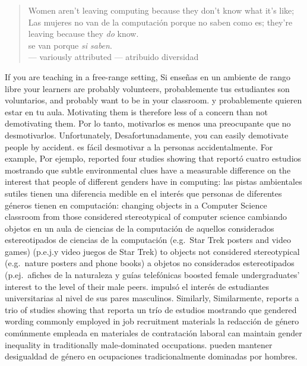
\begin{quote}

  Women aren't leaving computing because they don't know what it's like;
  Las mujeres no van de la computación porque no saben como es;
  they're leaving because they \emph{do} know. \\
  se van porque \emph{si saben}. \\
  --- variously attributed
  --- atribuido diversidad

\end{quote}

If you are teaching in a free-range setting,
Si enseñas en un ambiente de rango libre
your learners are probably volunteers,
probablemente tus estudiantes son voluntarios,
and probably want to be in your classroom.
y probablemente quieren estar en tu aula.
Motivating them is therefore less of a concern than not demotivating them.
Por lo tanto, motivarlos es menos una preocupante que no desmotivarlos.
Unfortunately,
Desafortunadamente,
you can easily demotivate people by accident.
es fácil desmotivar a la personas accidentalmente.
For example,
Por ejemplo,
\cite{Cher2009} reported four studies showing that
\cite{Cher2009} reportó cuatro estudios mostrando que
subtle environmental clues have a measurable difference on the interest that people of different genders have in computing:
las pistas ambientales sutiles tienen una diferencia medible en el interés que personas de diferentes géneros tienen en computación:
changing objects in a Computer Science classroom from those considered stereotypical of computer science
cambiando objetos en un aula de ciencias de la computación de aquellos considerados estereotipados de ciencias de la computación
(e.g.\ Star Trek posters and video games)
(p.e.j.\afiches y video juegos de Star Trek)
to objects not considered stereotypical (e.g.\ nature posters and phone books)
a objetos no considerados estereotipados (p.ej.\ afiches de la naturaleza y guías telefónicas
boosted female undergraduates' interest to the level of their male peers.
impulsó el interés de estudiantes universitarias al nivel de sus pares masculinos.
Similarly,
Similarmente,
\cite{Gauc2011} reports a trio of studies showing that
\cite{Gauc2011} reporta un trío de estudios mostrando que
gendered wording commonly employed in job recruitment materials
la redacción de género comúnmente empleada en materiales de contratación laboral 
can maintain gender inequality in traditionally male-dominated occupations.
pueden mantener desigualdad de género en ocupaciones tradicionalmente dominadas por hombres.

